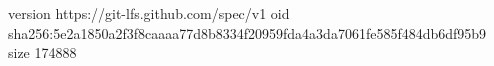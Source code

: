 version https://git-lfs.github.com/spec/v1
oid sha256:5e2a1850a2f3f8caaaa77d8b8334f20959fda4a3da7061fe585f484db6df95b9
size 174888
